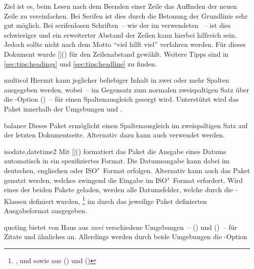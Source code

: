 \begin{packages}
  Ziel ist es, beim Lesen nach dem Beenden einer Zeile das Auffinden der neuen 
  Zeile zu vereinfachen. Bei Serifen ist dies durch die Betonung der Grundlinie 
  sehr gut möglich. Bei serifenlosen Schriften~-- wie der im \TUDCD verwendeten 
  \OpenSans~-- ist dies schwieriger und ein erweiterter Abstand der Zeilen kann 
  hierbei hilfreich sein. Jedoch sollte nicht nach dem Motto 
  \enquote{viel hilft viel} verfahren werden. Für dieses Dokument wurde 
  []() für den 
  Zeilenabstand gewählt. Weitere Tipps sind in \autoref{sec:tips:headings} und 
  \autoref{sec:tips:headline} zu finden.
\item[multicol]
  Hiermit kann jeglicher beliebiger Inhalt in zwei oder mehr Spalten ausgegeben 
  werden, wobei~-- im Gegensatz zum normalen zweispaltigen Satz über die
  \KOMAScript-Option ()~-- für einen 
  Spaltenausgleich gesorgt wird. Unterstützt wird das Paket innerhalb der 
  Umgebungen  und .
\item[balance]
  Dieses Paket ermöglicht einen Spaltenausgleich im zweispaltigen Satz auf der 
  letzten Dokumentseite. Alternativ dazu kann auch  verwendet 
  werden.
\item[isodate,datetime2]
  Mit []() formatiert das 
  Paket  die Ausgabe eines Datums automatisch in ein 
  spezifiziertes Format. Die Datumsangabe kann dabei im deutschen, englischen 
  oder ISO"~Format erfolgen. Alternativ kann auch das Paket 
  genutzt werden, welches zwingend die Eingabe im ISO"~Format erfordert. Wird
  eines der beiden Pakete geladen, werden alle Datumsfelder, welche durch die 
  \TUDScript-Klassen definiert wurden,%
  \footnote{%
    ,  und  sowie aus 
     () und 
    ()%
  }
  im durch das jeweilige Paket definierten Ausgabeformat ausgegeben.
\item[quoting]
   bietet von Haus aus \emph{zwei} verschiedene Umgebungen~-- 
  () und 
  ()~-- für Zitate und ähnliches 
  an. Allerdings werden durch beide Umgebungen die \KOMAScript-Option 

\end{packages}
